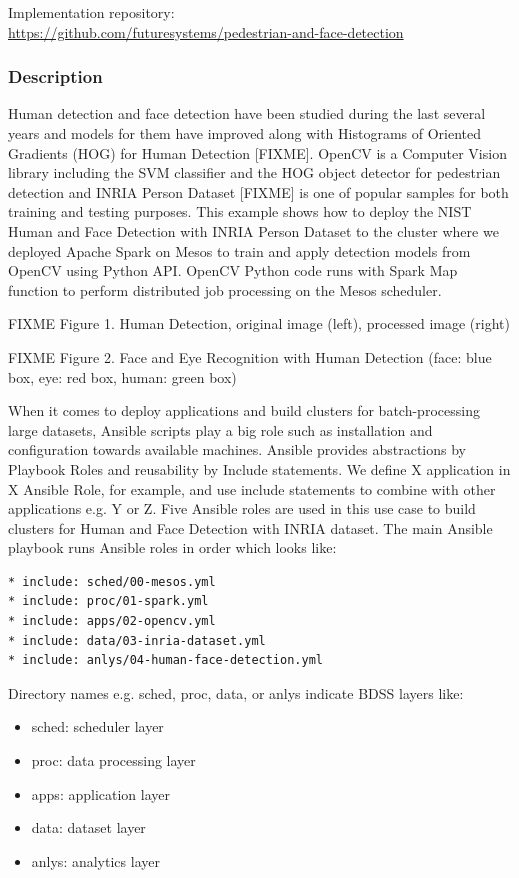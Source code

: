 \documentclass[9pt,twocolumn,twoside]{styles/osajnl}
\begin{document}
Implementation repository:\\
 \url{https://github.com/futuresystems/pedestrian-and-face-detection}

\subsubsection{Description}

Human detection and face detection have been studied during the last
several years and models for them have improved along with Histograms
of Oriented Gradients (HOG) for Human Detection [FIXME]. OpenCV is a
Computer Vision library including the SVM classifier and the HOG
object detector for pedestrian detection and INRIA Person Dataset [FIXME]
is one of popular samples for both training and testing purposes. This
example shows how to deploy the NIST Human and Face Detection with
INRIA Person Dataset to the cluster where we deployed Apache Spark on
Mesos to train and apply detection models from OpenCV using Python
API. OpenCV Python code runs with Spark Map function to perform
distributed job processing on the Mesos scheduler.
  
  

FIXME Figure 1. Human Detection, original image (left), processed image (right)
  
  

FIXME Figure 2. Face and Eye Recognition with Human Detection (face: blue box, eye: red box, human: green box)


When it comes to deploy applications and build clusters for
batch-processing large datasets, Ansible scripts play a big role such
as installation and configuration towards available machines. Ansible
provides abstractions by Playbook Roles and reusability by Include
statements. We define X application in X Ansible Role, for example,
and use include statements to combine with other applications e.g. Y
or Z. Five Ansible roles are used in this use case to build clusters
for Human and Face Detection with INRIA dataset. The main Ansible
playbook runs Ansible roles in order which looks like:


\begin{verbatim}
* include: sched/00-mesos.yml
* include: proc/01-spark.yml
* include: apps/02-opencv.yml
* include: data/03-inria-dataset.yml
* include: anlys/04-human-face-detection.yml
\end{verbatim}
	

Directory names e.g. sched, proc, data, or anlys indicate BDSS layers like:
\begin{itemize}
\item sched: scheduler layer
\item proc: data processing layer
\item apps: application layer
\item data: dataset layer
\item anlys: analytics layer
\end{itemize}
\end{document}

